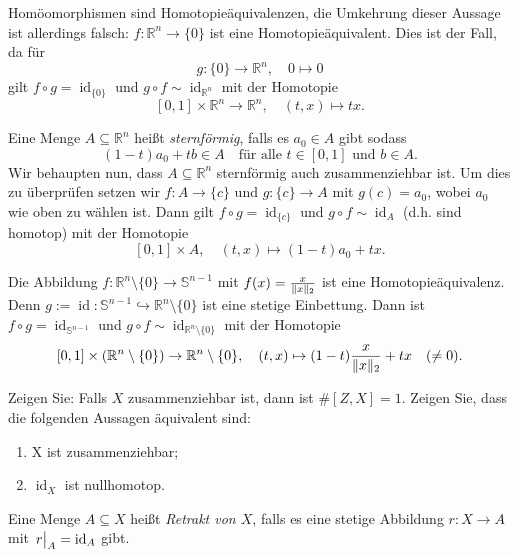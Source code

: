 \documentclass[
12pt, 
openany, 
a4paper, 
final,
fleqn, 
]{myclass}
\numberwithin{equation}{chapter}
\numberwithin{section}{chapter}
\newcommand{\RR}{\mathbb R}
\newcommand{\Ss}{\mathbb S}
\newcommand{\eval}[1]{\left. \vphantom{\int}#1\right\lvert}
\DeclareMathOperator{\id}{id}
\DeclarePairedDelimiter{\norm}{\lVert}{\rVert}
\begin{document}
\begin{rmk}\label{4.36}
Homöomorphismen sind Homotopieäquivalenzen, die Umkehrung dieser Aussage ist allerdings falsch: $ f:\RR^{n}\to \{0\} $ ist eine Homotopieäquivalent. Dies ist der Fall, da für 
\[
g: \{0\}\to \RR^n, \quad 0\mapsto 0
\]
gilt $ f\circ g =\id_{\{0\}} $ und $ g\circ f \sim \id_{\mathbb{R}^{n}} $ mit der Homotopie
\[
[0,1]\times \mathbb{R}^{n} \to \RR^{n}, \quad (t, x) \mapsto tx.
\]
\end{rmk}
\begin{eg}\label{4.38}
Eine Menge $ A\subseteq \mathbb{R}^{n} $ heißt \emph{sternförmig}, falls es $ a_{0}\in A $ gibt sodass 
\[
(1-t)a_{0} + tb \in A \quad \text{für alle }t\in [0,1] \text{ und }b\in A.
\]
Wir behaupten nun, dass $ A\subseteq \RR^n $ sternförmig auch zusammenziehbar ist. Um dies zu überprüfen setzen wir $ f: A \to \{c\} $ und $ g:\{c\}\to A $ mit $ g(c) = a_{0} $, wobei $ a_{0} $ wie oben zu wählen ist. Dann gilt $ f\circ g = \id_{\{c\}} $ und $ g\circ f \sim \id_{A} $ (d.h. sind homotop) mit der Homotopie
\[
[0,1]\times A, \quad (t, x)\mapsto  (1-t)a_{0}+tx.
\]
\end{eg}

\begin{eg}
Die Abbildung $ f: \RR^n\setminus \{0\} \to \Ss^{n-1}$ mit $ f(x) = \frac{x}{\norm{x}_{2}} $ ist eine Homotopieäquivalenz. Denn $ g:=\id: \Ss^{n-1} \hookrightarrow \RR^n\setminus \{0\} $ ist eine stetige Einbettung. Dann ist $ f\circ g= \id_{\Ss^{n-1}} $ und $ g\circ f\sim \id_{\RR^n\setminus\{0\}} $ mit der Homotopie
\[
[0, 1]\times (\RR^n\setminus\{0\}) \to \RR^n\setminus\{0\}, \quad (t,x)\mapsto (1-t)\frac{x}{\norm x_{2}} + tx\quad (\neq 0).
\]
\end{eg}

\begin{ex}\label{EX9.2}
Zeigen Sie: Falls $ X $ zusammenziehbar ist, dann ist $ \#[Z, X] =1$.
Zeigen Sie, dass die folgenden Aussagen äquivalent sind: 
\begin{enumerate}[label=\textit{\roman*})]
\item X ist zusammenziehbar;
\item $ \id_{X} $ ist nullhomotop.
\end{enumerate}
\end{ex}

\begin{defn}\label{4.39}
Eine Menge $ A\subseteq X $ heißt \emph{Retrakt von $ X $}, falls es eine stetige Abbildung $ r:X\to A $ mit $ \eval{r}_{A} = \id_{A} $ gibt. 
\end{defn}
\end{document}
